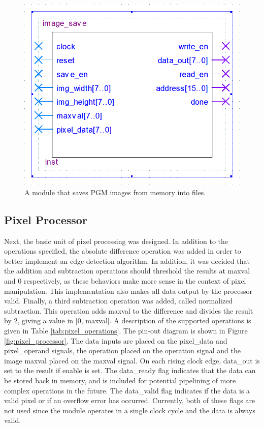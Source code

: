 \documentclass[a4paper, 10pt, titlepage]{article}
\begin{document}
\begin{figure}[htb]
    \centering
    \includegraphics[width=0.5\linewidth]{image_save_entity.PNG}
    \caption{A module that saves PGM images from memory into files.}
    \label{fig:image_save}
\end{figure}

\subsection{Pixel Processor}

Next, the basic unit of pixel processing was designed. In addition to the operations specified, the absolute difference operation was added in order to better implement an edge detection algorithm. In addition, it was decided that the addition and subtraction operations should threshold the results at maxval and 0 respectively, as these behaviors make more sense in the context of pixel manipulation. This implementation also makes all data output by the processor valid. Finally, a third subtraction operation was added, called normalized subtraction. This operation adds maxval to the difference and divides the result by 2, giving a value in [0, maxval]. A description of the supported operations is given in Table \ref{tab:pixel_operations}. The pin-out diagram is shown in Figure \ref{fig:pixel_processor}. The data inputs are placed on the pixel\_data and pixel\_operand signals, the operation placed on the operation signal and the image maxval placed on the maxval signal. On each rising clock edge, data\_out is set to the result if enable is set. The data\_ready flag indicates that the data can be stored back in memory, and is included for potential pipelining of more complex operations in the future. The data\_valid flag indicates if the data is a valid pixel or if an overflow error has occurred. Currently, both of these flags are not used since the module operates in a single clock cycle and the data is always valid.
\end{document}
